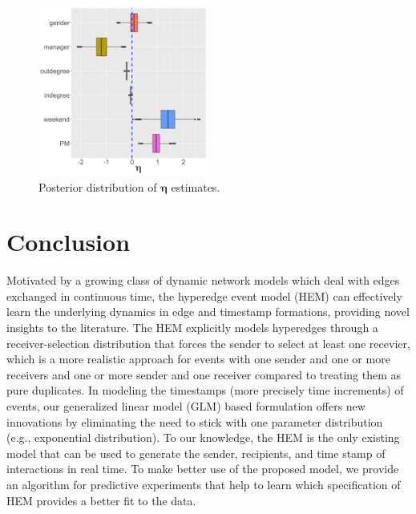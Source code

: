 \documentclass[ba]{imsart}
\numberwithin{equation}{section}
\theoremstyle{plain}
\begin{document}
			\begin{figure}[!t]
				\centering
				\includegraphics[width=0.4975\textwidth]{img/etaplotnew-1.png}	
				\caption {Posterior distribution of $\boldsymbol{\eta}$ estimates.}
				\label{figure:etaresults}
			\end{figure}	
	\section{Conclusion}\label{sec:conclusion}
	Motivated by a growing class of dynamic network models which deal with edges exchanged in continuous time, the hyperedge event model (HEM) can effectively learn the underlying dynamics in edge and timestamp formations, providing novel insights to the literature. The HEM explicitly models hyperedges through a receiver-selection distribution that forces the sender to select at least one recevier, which is a more realistic approach for events with one sender and one or more receivers and one or more sender and one receiver compared to treating them as pure duplicates. In modeling the timestamps (more precisely time increments) of events, our generalized linear model (GLM) based formulation offers new innovations by eliminating the need to stick with one parameter distribution (e.g., exponential distribution). To our knowledge, the HEM is the only existing model that can be used to generate the sender, recipients, and time stamp of interactions in real time. To make better use of the proposed model, we provide an algorithm for predictive experiments that help to learn which specification of HEM provides a better fit to the data. 
	
\end{document}
